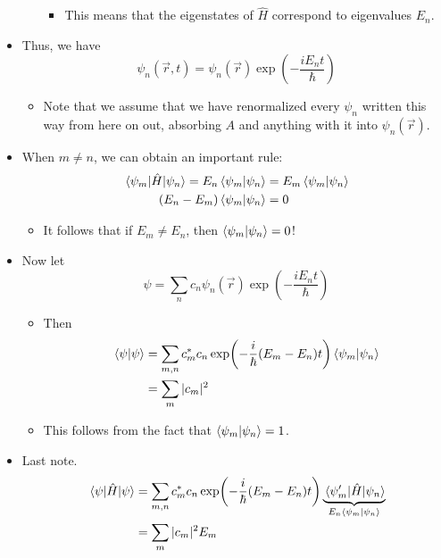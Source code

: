 \documentclass[../notes.tex]{subfiles}
\begin{document}
\begin{itemize}
\begin{itemize}
\begin{itemize}
            \item This means that the eigenstates of $\hat{H}$ correspond to eigenvalues $E_n$.
        \end{itemize}
    \end{itemize}
    \item Thus, we have
    \begin{equation*}
        \psi_n(\vec{r},t) = \psi_n(\vec{r})\exp(-\frac{iE_nt}{\hbar})
    \end{equation*}
    \begin{itemize}
        \item Note that we assume that we have renormalized every $\psi_n$ written this way from here on out, absorbing $A$ and anything with it into $\psi_n(\vec{r})$.
    \end{itemize}
    \item When $m\neq n$, we can obtain an important rule:
    \begin{align*}
        \mel{\psi_m}{\hat{H}}{\psi_n} = E_n\braket{\psi_m}{\psi_n} &= E_m\braket{\psi_m}{\psi_n}\\
        (E_n-E_m)\braket{\psi_m}{\psi_n} &= 0
    \end{align*}
    \begin{itemize}
        \item It follows that if $E_m\neq E_n$, then $\braket{\psi_m}{\psi_n}=0$!
    \end{itemize}
    \item Now let
    \begin{equation*}
        \psi = \sum_nc_n\psi_n(\vec{r})\exp(-\frac{iE_nt}{\hbar})
    \end{equation*}
    \begin{itemize}
        \item Then
        \begin{align*}
            \braket{\psi} &= \sum_{m,n}c_m^*c_n\exp(-\frac{i}{\hbar}(E_m-E_n)t)\braket{\psi_m}{\psi_n}\\
            &= \sum_m|c_m|^2
        \end{align*}
        \item This follows from the fact that $\braket{\psi_m}{\psi_n}=1$.
    \end{itemize}
    \item Last note.
    \begin{align*}
        \ev{\hat{H}}{\psi} &= \sum_{m,n}c_m^*c_n\exp(-\frac{i}{\hbar}(E_m-E_n)t)\underbrace{\mel{\psi_m'}{\hat{H}}{\psi_n}}_{E_n\braket{\psi_m}{\psi_n}}\\
        &= \sum_m|c_m|^2E_m
    \end{align*}
\end{itemize}
\end{document}
